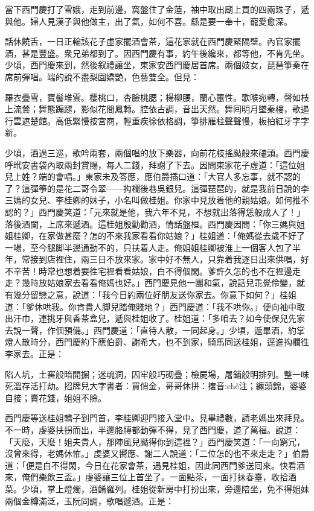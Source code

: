 當下西門慶打了雪娥，走到前邊，窩盤住了金蓮，袖中取出廟上買的四兩珠子，遞與他。婦人見漢子與他做主，出了氣，如何不喜。繇是要一奉十，寵愛愈深。

話休饒舌，一日正輪該花子虛家擺酒會茶，這花家就在西門慶緊隔壁。內官家擺酒，甚是豐盛。衆兄弟都到了。因西門慶有事，約午後纔來，都等他，不肯先坐。少頃，西門慶來到，然後叙禮讓坐，東家安西門慶居首席。兩個妓女，琵琶箏秦在席前彈唱。端的說不盡梨園嬌艷，色藝雙全。但見：

\begin{myquote}
羅衣疊雪，寶髻堆雲。櫻桃口，杏臉桃腮；楊柳腰，蘭心蕙性。歌喉宛轉，聲如枝上流鶯；舞態蹁躚，影似花間鳳轉。腔依古調，音出天然。舞囘明月墜秦樓，歌遏行雲遮楚館。高低緊慢按宮商，輕重疾徐依格調，箏排雁柱聲聲慢，板拍紅牙字字新。
\end{myquote}

少頃，酒過三巡，歌吟兩套，兩個唱的放下樂器，向前花枝搖颭般來磕頭。西門慶呼玳安書袋內取兩封賞賜，每人二錢，拜謝了下去。因問東家花子虛道：「這位姐兒上姓？端的會唱。」東家未及答應，應伯爵插口道：「大官人多忘事，就不認的了？這彈箏的是花二哥令翠——抅欄後巷吳銀兒。這彈琵琶的，就是我前日說的李三媽的女兒、李桂卿的妹子，小名叫做桂姐。你家中見放着他的親姑娘。如何推不認的？」西門慶笑道：「元來就是他，我六年不見，不想就出落得恁般成人了！」落後酒闌，上席來遞酒。這桂姐殷勤勸酒，情話盤桓。西門慶因問：「你三媽與姐姐桂卿，在家做甚麼？怎的不來我家看看你姑娘？」桂姐道：「俺媽從去歲不好了一場，至今腿脚半邊通動不的，只扶着人走。俺姐姐桂卿被淮上一個客人包了半年，常接到店裡住，兩三日不放來家。家中好不無人，只靠着我逐日出來供唱，好不辛苦！時常也想着要徃宅裡看看姑娘，白不得個閑。爹許久怎的也不在裡邊走走？幾時放姑娘家去看看俺媽也好。」西門慶見他一團和氣，說話兒乖覺伶變，就有幾分留戀之意，說道：「我今日約兩位好朋友送你家去。你意下如何？」桂姐道：「爹休哄我。你肯貴人脚兒踏俺賤地？」{}西門慶道：「我不哄你。」便向袖中取出汗巾，連挑牙與香茶盒兒，遞與桂姐收了。桂姐道：「多咱去？如今使保兒先家去說一聲，作個預備。」西門慶道：「直待人散，一同起身。」少頃，遞畢酒，約掌燈人散時分，西門慶約下應伯爵、謝希大，也不到家，騎馬同送桂姐，逕進抅欄徃李家去。正是：

\begin{myquote}
陷人坑，土窖般暗開掘；迷魂洞，囚牢般巧砌疊；檢屍場，屠鋪般明排列。整一味死溫存活打劫。招牌兒大字書者：買俏金，哥哥休拼：撦音:chě注；纏頭錦，婆婆自接；賣花錢，姐姐不賒。
\end{myquote}

西門慶等送桂姐轎子到門首，李桂卿迎門接入堂中。見畢禮數，請老媽出來拜見。不一時，虔婆扶拐而出，半邊胳膊都動彈不得，見了西門慶，道了萬福。說道：「天麼，天麼！姐夫貴人，那陣風兒颳得你到這裡？」西門慶笑道：「一向窮冗，沒曾來得，老媽休恠。」虔婆又嚮應、謝二人說道：「二位怎的也不來走走？」伯爵道：「便是白不得閑，今日在花家會茶，遇見桂姐，因此同西門爹送囘來。快看酒來，俺們樂飲三盃。」虔婆讓三位上首坐了。一面點茶，一面打抹春臺，收拾酒菜。少頃，掌上燈燭，酒餚羅列。桂姐從新房中打扮出來，{}旁邊陪坐，免不得姐妹兩個金樽滿泛，玉阮同調，歌唱遞酒。正是：


